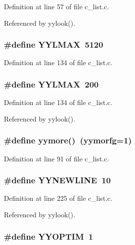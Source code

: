 Definition at line 57 of file c\_\-list.c.

Referenced by yylook().
\subsubsection{\setlength{\rightskip}{0pt plus 5cm}\#define YYLMAX~5120}\label{c__list_8c_528b4a36c14b40b6b7a96b1df6362045}




Definition at line 134 of file c\_\-list.c.
\subsubsection{\setlength{\rightskip}{0pt plus 5cm}\#define YYLMAX~200}\label{c__list_8c_528b4a36c14b40b6b7a96b1df6362045}




Definition at line 134 of file c\_\-list.c.

Referenced by yylook().
\subsubsection{\setlength{\rightskip}{0pt plus 5cm}\#define yymore()~(\bf{yymorfg}=1)}\label{c__list_8c_745d37b5e002b2e5f93ad42ea7b554be}




Definition at line 91 of file c\_\-list.c.
\subsubsection{\setlength{\rightskip}{0pt plus 5cm}\#define YYNEWLINE~10}\label{c__list_8c_dd266327fc2a9d001a866e62efae8a68}




Definition at line 225 of file c\_\-list.c.

Referenced by yylook().
\subsubsection{\setlength{\rightskip}{0pt plus 5cm}\#define YYOPTIM~1}\label{c__list_8c_8e9c50a68401eb5c606c16ad45397fa2}




